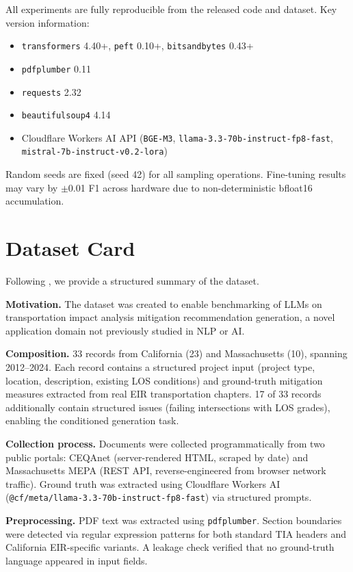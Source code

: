 \documentclass[preprint,12pt]{elsarticle}
\begin{document}
All experiments are fully reproducible from the released code and dataset.
Key version information:
\begin{itemize}
\item \texttt{transformers} 4.40+,
      \texttt{peft} 0.10+,
      \texttt{bitsandbytes} 0.43+
\item \texttt{pdfplumber} 0.11
\item \texttt{requests} 2.32
\item \texttt{beautifulsoup4} 4.14
\item Cloudflare Workers AI API (\texttt{BGE-M3},
      \texttt{llama-3.3-70b-instruct-fp8-fast},
      \texttt{mistral-7b-instruct-v0.2-lora})
\end{itemize}
Random seeds are fixed (seed 42) for all sampling operations.
Fine-tuning results may vary by $\pm$0.01 F1 across hardware due to
non-deterministic bfloat16 accumulation.


\section{Dataset Card}
\label{app:datasheet}

Following \citet{gebru2021datasheets}, we provide a structured summary of the
dataset.

\textbf{Motivation.}
The dataset was created to enable benchmarking of LLMs on transportation
impact analysis mitigation recommendation generation, a novel application
domain not previously studied in NLP or AI.

\textbf{Composition.}
33 records from California (23) and Massachusetts (10), spanning 2012--2024.
Each record contains a structured project input (project type, location,
description, existing LOS conditions) and ground-truth mitigation measures
extracted from real EIR transportation chapters.
17 of 33 records additionally contain structured issues (failing intersections
with LOS grades), enabling the conditioned generation task.

\textbf{Collection process.}
Documents were collected programmatically from two public portals:
CEQAnet (server-rendered HTML, scraped by date) and Massachusetts MEPA
(REST API, reverse-engineered from browser network traffic).
Ground truth was extracted using Cloudflare Workers AI
(\texttt{@cf/meta/llama-3.3-70b-instruct-fp8-fast}) via structured prompts.

\textbf{Preprocessing.}
PDF text was extracted using \texttt{pdfplumber}.
Section boundaries were detected via regular expression patterns for both
standard TIA headers and California EIR-specific variants.
A leakage check verified that no ground-truth language appeared in input fields.
\end{document}
